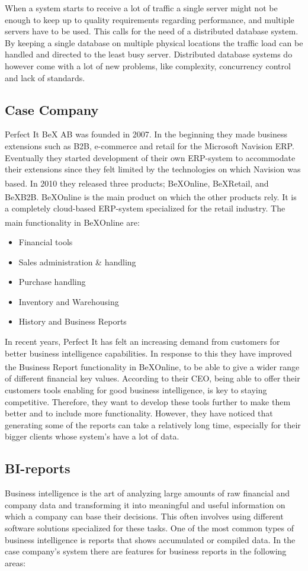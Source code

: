 \documentclass{cslthse-msc}
\newcommand{\bex}{BeX\textsuperscript{\textregistered}}
\begin{document}
When a system starts to receive a lot of traffic a single server might not be enough to keep up to quality requirements regarding performance, and multiple servers have to be used. This calls for the need of a distributed database system. By keeping a single database on multiple physical locations the traffic load can be handled and directed to the least busy server. Distributed database systems do however come with a lot of new problems, like complexity, concurrency control and lack of standards.

\subsection{Case Company}
Perfect It BeX AB was founded in 2007. In the beginning they made business extensions such as B2B, e-commerce and retail for the Microsoft Navision ERP. Eventually they started development of their own ERP-system to accommodate their extensions since they felt limited by the technologies on which Navision was based. In 2010 they released three products; \bex Online, \bex Retail, and \bex B2B. \bex Online is the main product on which the other products rely. It is a completely cloud-based ERP-system specialized for the retail industry. The main functionality in \bex Online are:

\begin{itemize}
\item Financial tools
\item Sales administration \& handling
\item Purchase handling
\item Inventory and Warehousing
\item History and Business Reports
\end{itemize}

In recent years, Perfect It has felt an increasing demand from customers for better business intelligence capabilities. In response to this they have improved the Business Report functionality in \bex Online, to be able to give a wider range of different financial key values. According to their CEO, being able to offer their customers tools enabling for good business intelligence, is key to staying competitive. Therefore, they want to develop these tools further to make them better and to include more functionality. However, they have noticed that generating some of the reports can take a relatively long time, especially for their bigger clients whose system's have a lot of data.

\subsection{BI-reports}\label{sec:BI}
Business intelligence is the art of analyzing large amounts of raw financial and company data and transforming it into meaningful and useful information on which a company can base their decisions. This often involves using different software solutions specialized for these tasks. One of the most common types of business intelligence is reports that shows accumulated or compiled data. In the case company's system there are features for business reports in the following areas:
\end{document}

